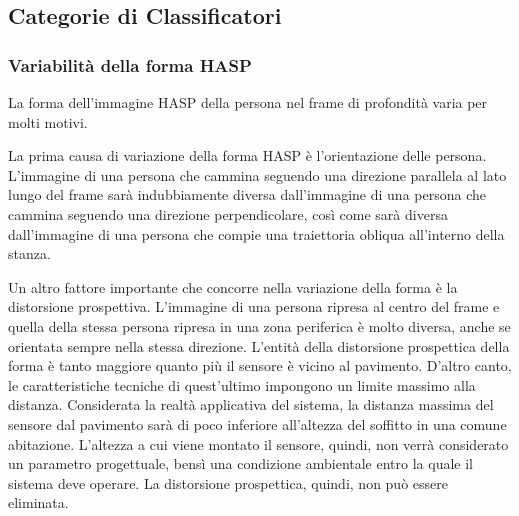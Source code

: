         \subsection{Categorie di Classificatori}
        \label{sub:classifiers_categories}
            \subsubsection{Variabilità della forma HASP}
                La forma dell'immagine HASP della persona nel frame di profondità varia per molti motivi.

                La prima causa di variazione della forma HASP è l'orientazione delle persona.
                L'immagine di una persona che cammina seguendo una direzione parallela al lato lungo del frame sarà indubbiamente diversa dall'immagine di una persona che cammina seguendo una direzione perpendicolare, così come sarà diversa dall'immagine di una persona che compie una traiettoria obliqua all'interno della stanza.

                Un altro fattore importante che concorre nella variazione della forma è la distorsione prospettiva.
                L'immagine di una persona ripresa al centro del frame e quella della stessa persona ripresa in una zona periferica è molto diversa, anche se orientata sempre nella stessa direzione.
                L'entità della distorsione prospettica della forma è tanto maggiore quanto più il sensore è vicino al pavimento. D'altro canto, le caratteristiche tecniche di quest'ultimo impongono un limite massimo alla distanza.
                Considerata la realtà applicativa del sistema, la distanza massima del sensore dal pavimento sarà di poco inferiore all'altezza del soffitto in una comune abitazione.
                L'altezza a cui viene montato il sensore, quindi, non verrà considerato un parametro progettuale, bensì una condizione ambientale entro la quale il sistema deve operare.
                La distorsione prospettica, quindi, non può essere eliminata.

